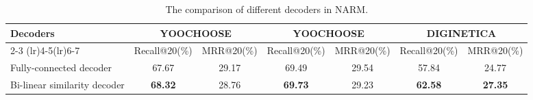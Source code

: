 \documentclass[sigconf]{acmart}
\begin{document}
    \begin{table*}
        \caption{The comparison of different decoders in NARM.}
	    \label{tab: decoder comparision}
	    \begin{tabular}{lcccccc}
		    \toprule
    	    \multirow{3}{*}{Decoders} & \multicolumn{2}{c}{YOOCHOOSE } & \multicolumn{2}{c}{YOOCHOOSE } & \multicolumn{2}{c}{DIGINETICA}\\
    	    \cmidrule(lr){2-3} \cmidrule(lr){4-5}\cmidrule(lr){6-7}
		        & Recall@20(\%) & MRR@20(\%) & Recall@20(\%) & MRR@20(\%) & Recall@20(\%) & MRR@20(\%)\\
    	    \midrule
    		    Fully-connected decoder & 67.67 & 29.17 & 69.49 & 29.54 & 57.84 & 24.77\\
    		    Bi-linear similarity decoder & \textbf{68.32} & 28.76 & \textbf{69.73} & 29.23 & \textbf{62.58} & \textbf{27.35}\\
    	    \bottomrule
	   \end{tabular}
    \end{table*}
    
\end{document}
